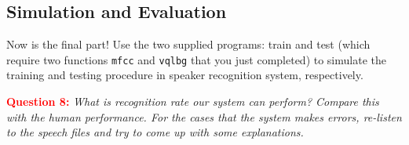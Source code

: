 \documentclass{article}
\begin{document}
\subsection{Simulation and Evaluation}
Now is the final part!  Use the two supplied programs: train and test (which require two functions \texttt{mfcc} and \texttt{vqlbg} that you just completed) to simulate the training and testing procedure in speaker recognition system, respectively.

\textcolor{red}{\textbf{Question 8:}} \textit{What is recognition rate our system can perform?  Compare this with the human performance.  For the cases that the system makes errors, re-listen to the speech files and try to come up with some explanations.}
\end{document}
